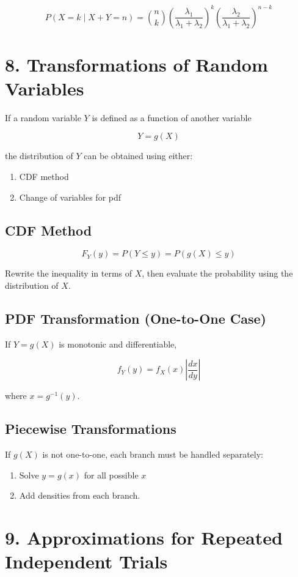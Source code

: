 \documentclass[12pt]{article}
\begin{document}
\[
P(X=k \mid X+Y=n)
=
\binom{n}{k}
\left(\frac{\lambda_1}{\lambda_1+\lambda_2}\right)^k
\left(\frac{\lambda_2}{\lambda_1+\lambda_2}\right)^{n-k}
\]

\section*{8. Transformations of Random Variables}

If a random variable $Y$ is defined as a function of another variable

\[
Y=g(X)
\]

the distribution of $Y$ can be obtained using either:

\begin{enumerate}
\item CDF method
\item Change of variables for pdf
\end{enumerate}

\subsection*{CDF Method}

\[
F_Y(y)=P(Y\le y)=P(g(X)\le y)
\]

Rewrite the inequality in terms of $X$, then evaluate the probability using the distribution of $X$.

\subsection*{PDF Transformation (One-to-One Case)}

If $Y=g(X)$ is monotonic and differentiable,

\[
f_Y(y)=f_X(x)\left|\frac{dx}{dy}\right|
\]

where $x=g^{-1}(y)$.

\subsection*{Piecewise Transformations}

If $g(X)$ is not one-to-one, each branch must be handled separately:

\begin{enumerate}
\item Solve $y=g(x)$ for all possible $x$
\item Add densities from each branch.
\end{enumerate}

\section*{9. Approximations for Repeated Independent Trials}
\end{document}

